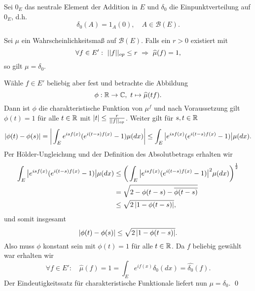 Sei $0_E$ das neutrale Element der Addition in $E$ und $\delta_0$ die Einpunktverteilung auf $0_E$, d.h. 
$$
    \delta_0(A) = 1_A(0), \quad A \in \mathcal{B}(E). 
$$

\begin{proposition}
    Sei $\mu$ ein Wahrscheinlichkeitsmaß auf $\mathcal{B}(E)$. Falls ein $r > 0$ existiert mit
    $$
       \forall f \in E': \  \lvert\lvert f \rvert\rvert_{op} \leq r \ \Rightarrow \ \widehat{\mu}(f) = 1,
    $$
    so gilt $\mu = \delta_0$. 
\end{proposition}

\begin{proof*}
    Wähle $f \in E'$ beliebig aber fest und betrachte die Abbildung 
    $$
        \phi : \mathbb{R} \to \mathbb{C}, \ t \mapsto \widehat{\mu}(tf). 
    $$
    Dann ist $\phi$ die charakteristische Funktion von $\mu^{f}$ und nach Voraussetzung gilt $\phi(t) = 1$ für alle $t \in \mathbb{R}$ mit $\left| t \right| \leq \frac{r}{\lvert\lvert f \rvert\rvert_{op}}$. 
    Weiter gilt für $s,t \in \mathbb{R}$
    \begin{align*}
        \left| \phi(t) - \phi(s) \right| = \bigg\lvert\int_E e^{isf(x)}(e^{i(t-s)f(x)} - 1)\mu(dx)\bigg\rvert \leq \int_E\big\lvert e^{isf(x)}(e^{i(t-s)f(x)} - 1)\big\rvert\mu(dx).
    \end{align*}
    Per Hölder-Ungleichung und der Definition des Absolutbetrags erhalten wir 
    \begin{align*}
        \int_E\big\lvert e^{isf(x)}(e^{i(t-s)f(x)} - 1)\big\rvert\mu(dx) &\leq \bigg(\int_E\big\lvert e^{isf(x)}(e^{i(t-s)f(x)} - 1)\big\rvert^2\mu(dx)\bigg)^{\frac{1}{2}} \\\
                                                          &= \sqrt{2 - \phi(t-s) - \overline{\phi(t-s)}} \\\
                                                          &\leq \sqrt{2\left| 1-\phi(t-s) \right|},
    \end{align*}
    und somit insgesamt 
    $$
        \left| \phi(t) - \phi(s) \right| \leq \sqrt{2\left| 1-\phi(t-s) \right|}.
    $$
    Also muss $\phi$ konstant sein mit $\phi(t) = 1$ für alle $t \in \mathbb{R}$. Da $f$ beliebig gewählt war erhalten wir
    $$
        \forall f \in E': \quad \widehat{\mu}(f) = 1 = \int_E e^{if(x)}\delta_0(dx) = \widehat{\delta_0}(f). 
    $$
    Der Eindeutigkeitssatz für charakteristische Funktionale liefert nun $\mu = \delta_0$. \qed
\end{proof*}

